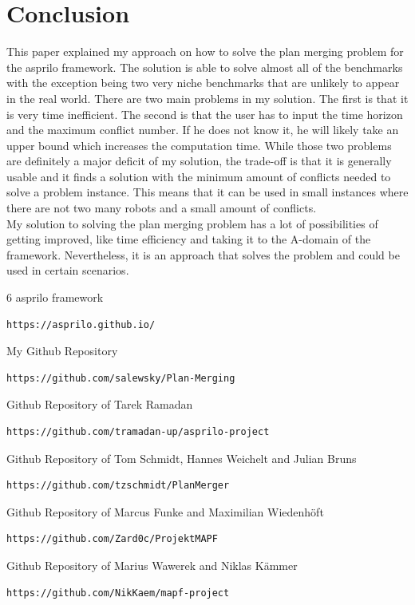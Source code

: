 \documentclass[runningheads]{llncs}
\begin{document}
\section{Conclusion}
This paper explained my approach on how to solve the plan merging problem for the asprilo framework. The solution is able to solve almost all of the benchmarks with the exception being two very niche 
benchmarks that are unlikely to appear in the real world. There are two main problems in my solution. The first is that it is very time inefficient. The second is that the user has to input the time horizon and
the maximum conflict number. If he does not know it, he will likely take an upper bound which increases the computation time. While those two problems are definitely a major deficit of my solution, the trade-off
is that it is generally usable and it finds a solution with the minimum amount of conflicts needed to solve a problem instance. 
This means that it can be used in small instances where there are not two many robots and a small amount of conflicts.\\
My solution to solving the plan merging problem has a lot of possibilities of getting improved, like time efficiency and taking it to the A-domain of the framework. Nevertheless, it is an approach that solves the problem and could
be used in certain scenarios.

\newpage

\begin{thebibliography} {6}
asprilo framework
\begin{verbatim}
https://asprilo.github.io/
\end{verbatim}

My Github Repository
\begin{verbatim}
https://github.com/salewsky/Plan-Merging
\end{verbatim}

Github Repository of Tarek Ramadan
\begin{verbatim}
https://github.com/tramadan-up/asprilo-project
\end{verbatim}

Github Repository of Tom Schmidt, Hannes Weichelt and Julian Bruns
\begin{verbatim}
https://github.com/tzschmidt/PlanMerger
\end{verbatim}

Github Repository of Marcus Funke and Maximilian Wiedenhöft
\begin{verbatim}
https://github.com/Zard0c/ProjektMAPF
\end{verbatim}

Github Repository of Marius Wawerek and Niklas Kämmer
\begin{verbatim}
https://github.com/NikKaem/mapf-project
\end{verbatim}

\end{thebibliography}
\end{document}
